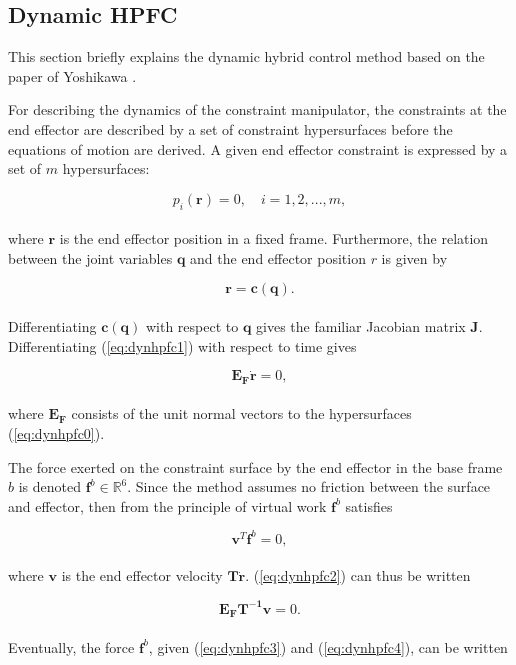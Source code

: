 \subsection{Dynamic HPFC}\label{subseq:dynhpfc}

This section briefly explains the dynamic hybrid control method based on the paper of Yoshikawa \cite{yoshikawa1987dynamic}. 

For describing the dynamics of the constraint manipulator, the constraints at the end effector are described by a set of constraint hypersurfaces before the equations of motion are derived. A given end effector constraint is expressed by a set of $m$ hypersurfaces:

\begin{equation}\label{eq:dynhpfc0}
    p_i(\mathbf{r}) = 0, \quad i = 1, 2, ..., m,
\end{equation}
\\
where $\mathbf{r}$ is the end effector position in a fixed frame. Furthermore, the relation between the joint variables $\mathbf{q}$ and the end effector position $r$ is given by

\begin{equation}\label{eq:dynhpfc1}
    \mathbf{r = c(q)}.
\end{equation}
\\
Differentiating $\mathbf{c(q)}$ with respect to $\mathbf{q}$ gives the familiar Jacobian matrix $\mathbf{J}$.
Differentiating (\ref{eq:dynhpfc1}) with respect to time gives

\begin{equation}\label{eq:dynhpfc2}
    \mathbf{E_F \dot{r}} = 0,
\end{equation}
\\
where $\mathbf{E_F}$ consists of the unit normal vectors to the hypersurfaces (\ref{eq:dynhpfc0}).

The force exerted on the constraint surface by the end effector in the base frame $b$ is denoted $\mathbf{f}^b \in \mathbb{R}^6$. Since the method assumes no friction between the surface and effector, then from the principle of virtual work $\mathbf{f}^b$ satisfies

\begin{equation}\label{eq:dynhpfc3}
    \mathbf{v}^T \mathbf{f}^b = 0,
\end{equation}
\\
where $\mathbf{v}$ is the end effector velocity $\mathbf{T\dot{r}}$. (\ref{eq:dynhpfc2}) can thus be written

\begin{equation}\label{eq:dynhpfc4}
    \mathbf{E_F T^{-1} v} = 0.    
\end{equation}
\\
Eventually, the force $\mathbf{f}^b$, given (\ref{eq:dynhpfc3}) and (\ref{eq:dynhpfc4}), can be written 

